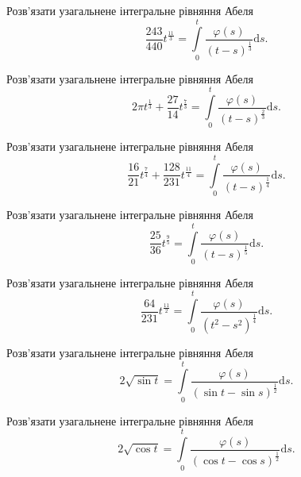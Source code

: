 \documentclass[12pt]{extarticle}
\begin{document}
\begin{Exercise}
Розв’язати узагальнене інтегральне рівняння Абеля \[\dfrac{243}{440} t^{\frac{11}{3}} = \int\limits_{0}^{t} \dfrac{\varphi(s)}{(t-s)^{\frac{1}{3}}} \mathrm{d}s.\]
\end{Exercise}

\begin{Exercise}
Розв’язати узагальнене інтегральне рівняння Абеля \[2\pi t^{\frac{1}{3}} + \dfrac{27}{14} t^{\frac{7}{3}} = \int\limits_{0}^{t} \dfrac{\varphi(s)}{(t-s)^{\frac{2}{3}}} \mathrm{d}s.\]
\end{Exercise}

\begin{Exercise}
Розв’язати узагальнене інтегральне рівняння Абеля \[\dfrac{16}{21} t^{\frac{7}{4}} + \dfrac{128}{231} t^{\frac{11}{4}} = \int\limits_{0}^{t} \dfrac{\varphi(s)}{(t-s)^{\frac{1}{4}}} \mathrm{d}s.\]
\end{Exercise}

\begin{Exercise}
Розв’язати узагальнене інтегральне рівняння Абеля \[\dfrac{25}{36} t^{\frac{9}{5}} = \int\limits_{0}^{t} \dfrac{\varphi(s)}{(t-s)^{\frac{1}{5}}} \mathrm{d}s.\]
\end{Exercise}

\begin{Exercise}
Розв’язати узагальнене інтегральне рівняння Абеля \[\dfrac{64}{231} t^{\frac{11}{2}} = \int\limits_{0}^{t} \dfrac{\varphi(s)}{(t^2-s^2)^{\frac{1}{4}}} \mathrm{d}s.\]
\end{Exercise}

\begin{Exercise}
Розв’язати узагальнене інтегральне рівняння Абеля \[2\sqrt{\sin t} = \int\limits_{0}^{t} \dfrac{\varphi(s)}{(\sin t - \sin s)^{\frac{1}{2}}} \mathrm{d}s.\]
\end{Exercise}

\begin{Exercise}
Розв’язати узагальнене інтегральне рівняння Абеля \[2\sqrt{\cos t} = \int\limits_{0}^{t} \dfrac{\varphi(s)}{(\cos t - \cos s)^{\frac{1}{2}}} \mathrm{d}s.\]
\end{Exercise}
\end{document}
